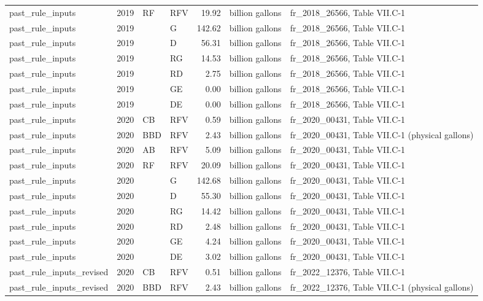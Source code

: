 \begin{longtable}{p{2.3cm}p{0.7cm}p{1.0cm}p{2.6cm}rp{1.7cm}p{4.6cm}}
past\_rule\_inputs & 2019 & RF & RFV & 19.92 & billion gallons & fr\_2018\_26566, Table VII.C-1 \\
past\_rule\_inputs & 2019 &  & G & 142.62 & billion gallons & fr\_2018\_26566, Table VII.C-1 \\
past\_rule\_inputs & 2019 &  & D & 56.31 & billion gallons & fr\_2018\_26566, Table VII.C-1 \\
past\_rule\_inputs & 2019 &  & RG & 14.53 & billion gallons & fr\_2018\_26566, Table VII.C-1 \\
past\_rule\_inputs & 2019 &  & RD & 2.75 & billion gallons & fr\_2018\_26566, Table VII.C-1 \\
past\_rule\_inputs & 2019 &  & GE & 0.00 & billion gallons & fr\_2018\_26566, Table VII.C-1 \\
past\_rule\_inputs & 2019 &  & DE & 0.00 & billion gallons & fr\_2018\_26566, Table VII.C-1 \\
past\_rule\_inputs & 2020 & CB & RFV & 0.59 & billion gallons & fr\_2020\_00431, Table VII.C-1 \\
past\_rule\_inputs & 2020 & BBD & RFV & 2.43 & billion gallons & fr\_2020\_00431, Table VII.C-1 (physical gallons) \\
past\_rule\_inputs & 2020 & AB & RFV & 5.09 & billion gallons & fr\_2020\_00431, Table VII.C-1 \\
past\_rule\_inputs & 2020 & RF & RFV & 20.09 & billion gallons & fr\_2020\_00431, Table VII.C-1 \\
past\_rule\_inputs & 2020 &  & G & 142.68 & billion gallons & fr\_2020\_00431, Table VII.C-1 \\
past\_rule\_inputs & 2020 &  & D & 55.30 & billion gallons & fr\_2020\_00431, Table VII.C-1 \\
past\_rule\_inputs & 2020 &  & RG & 14.42 & billion gallons & fr\_2020\_00431, Table VII.C-1 \\
past\_rule\_inputs & 2020 &  & RD & 2.48 & billion gallons & fr\_2020\_00431, Table VII.C-1 \\
past\_rule\_inputs & 2020 &  & GE & 4.24 & billion gallons & fr\_2020\_00431, Table VII.C-1 \\
past\_rule\_inputs & 2020 &  & DE & 3.02 & billion gallons & fr\_2020\_00431, Table VII.C-1 \\
past\_rule\_inputs\_revised & 2020 & CB & RFV & 0.51 & billion gallons & fr\_2022\_12376, Table VII.C-1 \\
past\_rule\_inputs\_revised & 2020 & BBD & RFV & 2.43 & billion gallons & fr\_2022\_12376, Table VII.C-1 (physical gallons) \\

\end{longtable}
